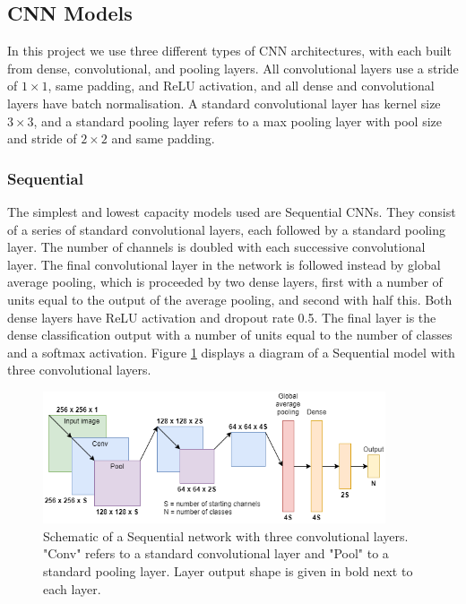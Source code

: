\documentclass[12pt]{article}
\begin{document}
\subsection{CNN Models}
In this project we use three different types of CNN architectures, with each built from dense, convolutional, and pooling layers. All convolutional layers use a stride of $1\times1$, same padding, and ReLU activation, and all dense and convolutional layers have batch normalisation. A standard convolutional layer has kernel size $3\times3$, and a standard pooling layer refers to a max pooling layer with pool size and stride of $2\times2$ and same padding.

\subsubsection{Sequential}
The simplest and lowest capacity models used are Sequential CNNs. They consist of a series of standard convolutional layers, each followed by a standard pooling layer. The number of channels is doubled with each successive convolutional layer. The final convolutional layer in the network is followed instead by global average pooling, which is proceeded by two dense layers, first with a number of units equal to the output of the average pooling, and second with half this. Both dense layers have ReLU activation and dropout rate 0.5. The final layer is the dense classification output with a number of units equal to the number of classes and a softmax activation. Figure \ref{seqarch} displays a diagram of a Sequential model with three convolutional layers.
\begin{figure}[!h]
\centering
\includegraphics[width=0.9\textwidth]{images/sequential.png}
\caption{Schematic of a Sequential network with three convolutional layers. "Conv" refers to a standard convolutional layer and "Pool" to a standard pooling layer. Layer output shape is given in bold next to each layer.}
\label{seqarch}
\end{figure}
\end{document}

